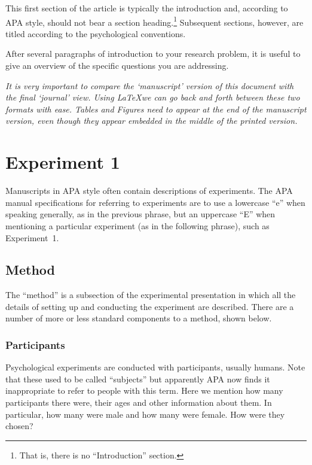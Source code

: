 \documentclass[doc]{apa}%
\begin{document}

This first section of the article is typically the introduction and, according to APA style, should not bear a section heading.\footnote{That is, there is no ``Introduction'' section.} Subsequent sections, however, are titled according to the psychological conventions. %

After several paragraphs of introduction to your research problem, it is useful  to give an overview of the specific questions you are addressing.  

\emph{It is very important to compare the `manuscript' version of this document with the final `journal' view.  Using \LaTeX we can go back and forth between these two formats with ease.  Tables and Figures need to appear at the end of the manuscript version, even though they appear embedded in the middle of the printed version.  }

\section{Experiment 1} 
Manuscripts in APA style often contain descriptions of experiments.  The APA manual specifications for referring to experiments are to use a lowercase ``e'' when speaking generally, as in the previous phrase, but an uppercase ``E'' when mentioning a particular experiment (as in the following phrase), such as Experiment~1.  %

\subsection{Method}
The ``method'' is a subsection of the experimental presentation in which all the details of setting up and conducting the experiment are described.  There are a number of more or less standard components to a method, shown below.  %

%
\subsubsection{Participants}
Psychological experiments are conducted with participants, usually humans. Note that these used to be called ``subjects'' but apparently APA now finds it inappropriate to refer to people with this term.  Here we mention how many participants there were, their ages and other information about them.  In particular, how many were male and how many were female.  How were they chosen? %
\end{document}
